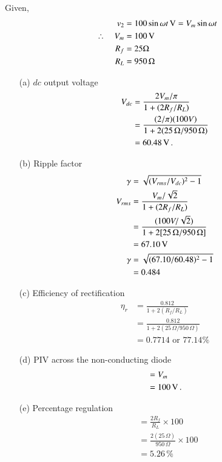 \begin{solution}
Given, 
\begin{align*}
v_2 & = 100 \sin \omega t \operatorname{\mathrm{V}} = V_m \sin \omega t\\
\therefore\quad V_m & = 100 \operatorname{\mathrm{V}}\\
R_f & = 25 \Omega\\
R_L & = 950\, \Omega
\end{align*}
\begin{itemize}
\item[(a)] $dc$ output voltage 
\begin{align*}
V_{dc} &= \frac{2V_m/\pi}{1 + (2 R_f /R_L)}\\
& = \frac{(2/\pi) (100 V)}{1 + 2 (25\, \Omega / 950\, \Omega)}\\
& = 60.48 \operatorname{\mathrm{V}}.
\end{align*}
 
\item[(b)] Ripple factor 
\begin{align*}
\gamma &  = \sqrt{(V_{rms} / V_{dc})^2  -1}\\
V_{rms}& = \frac{V_m /\sqrt{2}}{1 + (2 R_f / R_L)}\\
& = \frac{(100 V/\sqrt{2})}{1 + 2 [25\,\Omega /950\,\Omega]}\\
& = 67.10 \operatorname{\mathrm{V}}\\
\gamma & = \sqrt{(67.10/60.48)^2 -1}\\
& = 0.484
\end{align*}
 
\item[(c)] Efficiency of rectification
\begin{align*}
\eta_r & = \frac{0.812}{1+2 (R_f / R_L)}\\
& = \frac{0.812}{1+2 (25 \,\Omega / 950\, \Omega)}\\
& = 0.7714 \text{ or } 77.14 \% 
\end{align*}
 
\item[(d)] PIV across the non-conducting diode 
\begin{align*}
& = V_m\\
& = 100 \operatorname{\mathrm{V}}.
\end{align*}

\item[(e)] Percentage regulation
\begin{align*}
& = \frac{2 R_f}{R_L} \times 100\\
& = \frac{2(25\,\Omega)}{950\,\Omega} \times 100\\
& = 5.26\,\%
\end{align*}


\end{itemize}
\end{solution}
